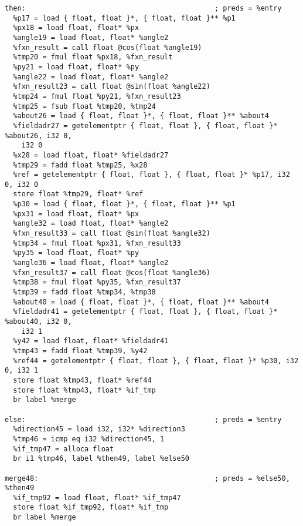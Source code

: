 \documentclass[main.tex]{subfiles}
\begin{document}
{\begin{lstlisting}
then:                                             ; preds = %entry
  %p17 = load { float, float }*, { float, float }** %p1
  %px18 = load float, float* %px
  %angle19 = load float, float* %angle2
  %fxn_result = call float @cos(float %angle19)
  %tmp20 = fmul float %px18, %fxn_result
  %py21 = load float, float* %py
  %angle22 = load float, float* %angle2
  %fxn_result23 = call float @sin(float %angle22)
  %tmp24 = fmul float %py21, %fxn_result23
  %tmp25 = fsub float %tmp20, %tmp24
  %about26 = load { float, float }*, { float, float }** %about4
  %fieldadr27 = getelementptr { float, float }, { float, float }* %about26, i32 0,
    i32 0
  %x28 = load float, float* %fieldadr27
  %tmp29 = fadd float %tmp25, %x28
  %ref = getelementptr { float, float }, { float, float }* %p17, i32 0, i32 0
  store float %tmp29, float* %ref
  %p30 = load { float, float }*, { float, float }** %p1
  %px31 = load float, float* %px
  %angle32 = load float, float* %angle2
  %fxn_result33 = call float @sin(float %angle32)
  %tmp34 = fmul float %px31, %fxn_result33
  %py35 = load float, float* %py
  %angle36 = load float, float* %angle2
  %fxn_result37 = call float @cos(float %angle36)
  %tmp38 = fmul float %py35, %fxn_result37
  %tmp39 = fadd float %tmp34, %tmp38
  %about40 = load { float, float }*, { float, float }** %about4
  %fieldadr41 = getelementptr { float, float }, { float, float }* %about40, i32 0,
    i32 1
  %y42 = load float, float* %fieldadr41
  %tmp43 = fadd float %tmp39, %y42
  %ref44 = getelementptr { float, float }, { float, float }* %p30, i32 0, i32 1
  store float %tmp43, float* %ref44
  store float %tmp43, float* %if_tmp
  br label %merge

else:                                             ; preds = %entry
  %direction45 = load i32, i32* %direction3
  %tmp46 = icmp eq i32 %direction45, 1
  %if_tmp47 = alloca float
  br i1 %tmp46, label %then49, label %else50

merge48:                                          ; preds = %else50, %then49
  %if_tmp92 = load float, float* %if_tmp47
  store float %if_tmp92, float* %if_tmp
  br label %merge


\end{lstlisting}}
\end{document}
